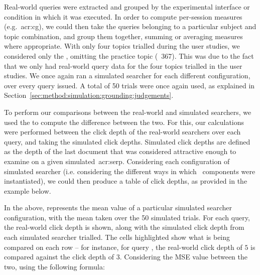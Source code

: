 Real-world queries were extracted and grouped by the experimental interface or condition in which it was executed. In order to compute per-session measures (e.g.~\gls{acr:cg}), we could then take the queries belonging to a particular subject and topic combination, and group them together, summing or averaging measures where appropriate. With only four topics trialled during the user studies, we considered only the , omitting the practice topic (\textnumero~367). This was due to the fact that we only had real-world query data for the four topics trialled in the user studies. We once again ran a simulated searcher for each different configuration, over every query issued. A total of 50 trials were once again used, as explained in Section~\ref{sec:method:simulation:grounding:judgements}.

To perform our comparisons between the real-world and simulated searchers, we used the  to compute the difference between the two. For this, our calculations were performed between the click depth of the real-world searchers over each query, and taking the simulated click depths. Simulated click depths are defined as the depth of the last document that was considered attractive enough to examine on a given simulated~\gls{acr:serp}. Considering each configuration of simulated searcher (i.e. considering the different ways in which \simiir~components were instantiated), we could then produce a table of click depths, as provided in the example below.

\begin{figure}[h]
    \centering
    \vspace*{-8mm}
\end{figure}

In the above,  represents the mean value of a particular simulated searcher configuration, with the mean taken over the 50 simulated trials. For each query, the real-world click depth is shown, along with the simulated click depth from each simulated searcher trialled. The cells highlighted show what is being compared on each row -- for instance, for query , the real-world click depth of $5$ is compared against the  click depth of $3$. Considering the MSE value between the two, using the following formula:

